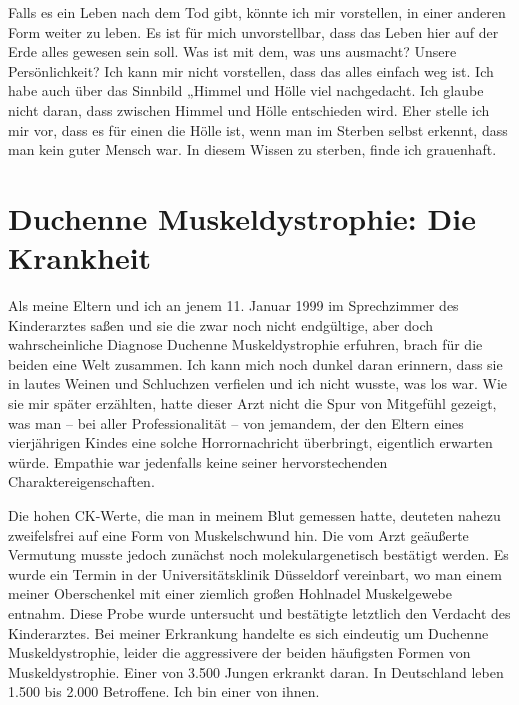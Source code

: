 \documentclass[fontsize=14pt,a4paper,headinclude,DIV=calc,automark]{scrbook}
\begin{document}
Falls es ein Leben nach dem Tod gibt, könnte ich mir vorstellen, in einer anderen Form weiter zu leben. Es ist für mich unvorstellbar, dass das Leben hier auf der Erde alles gewesen sein soll. Was ist mit dem, was uns ausmacht? Unsere Persönlichkeit? Ich kann mir nicht vorstellen, dass das alles einfach weg ist. Ich habe auch über das Sinnbild „Himmel und Hölle viel nachgedacht. Ich glaube nicht daran, dass zwischen Himmel und Hölle entschieden wird. Eher stelle ich mir vor, dass es für einen die Hölle ist, wenn man im Sterben selbst erkennt, dass man kein guter Mensch war. In diesem Wissen zu sterben, finde ich grauenhaft.

\thispagestyle{scrheadings} %

\leavevmode
\normalsize

\section{Duchenne Muskeldystrophie: Die Krankheit}

Als meine Eltern und ich an jenem 11. Januar 1999 im Sprechzimmer des Kinderarztes saßen und sie die zwar noch nicht endgültige, aber doch wahrscheinliche Diagnose Duchenne Muskeldystrophie erfuhren, brach für die beiden eine Welt zusammen. Ich kann mich noch dunkel daran erinnern, dass sie in lautes Weinen und Schluchzen verfielen und ich nicht wusste, was los war. Wie sie mir später erzählten, hatte dieser Arzt nicht die Spur von Mitgefühl gezeigt, was man – bei aller Professionalität – von jemandem, der den Eltern eines vierjährigen Kindes eine solche Horrornachricht überbringt, eigentlich erwarten würde. Empathie war jedenfalls keine seiner hervorstechenden Charaktereigenschaften.

Die hohen CK-Werte, die man in meinem Blut gemessen hatte, deuteten nahezu zweifelsfrei auf eine Form von Muskelschwund hin. Die vom Arzt geäußerte Vermutung musste jedoch zunächst noch molekulargenetisch bestätigt werden. Es wurde ein Termin in der Universitätsklinik Düsseldorf vereinbart, wo man einem meiner Oberschenkel mit einer ziemlich großen Hohlnadel Muskelgewebe entnahm. Diese Probe wurde untersucht und bestätigte letztlich den Verdacht des Kinderarztes. Bei meiner Erkrankung handelte es sich eindeutig um Duchenne Muskeldystrophie, leider die aggressivere der beiden häufigsten Formen von Muskeldystrophie. Einer von 3.500 Jungen erkrankt daran. In Deutschland leben 1.500 bis 2.000 Betroffene. Ich bin einer von ihnen.
\end{document}
